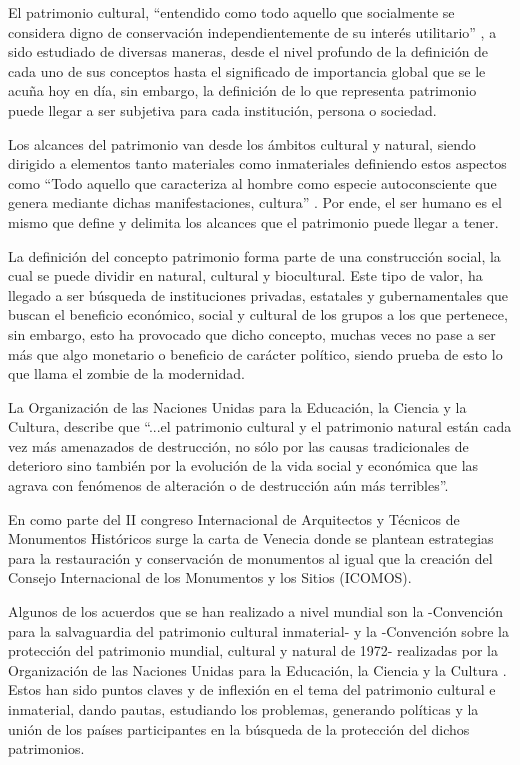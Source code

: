 El patrimonio cultural, ``entendido como todo aquello que socialmente se considera digno de conservación independientemente de su interés utilitario'' \citep[p. 63]{prats1998concepto}, a sido estudiado de diversas maneras, desde el nivel profundo de la definición de cada uno de sus conceptos hasta el significado de importancia global que se le acuña hoy en día, sin embargo, la definición de lo que representa patrimonio puede llegar a ser subjetiva para cada institución, persona o sociedad.

Los alcances del patrimonio van desde los ámbitos cultural y natural, siendo dirigido a elementos tanto materiales como inmateriales definiendo estos aspectos como ``Todo aquello que caracteriza al hombre como especie autoconsciente que genera mediante dichas manifestaciones, cultura'' \citep{dominguez2004pautas}. Por ende, el ser humano es el mismo que define y delimita los alcances que el patrimonio puede llegar a tener.

La definición del concepto patrimonio forma parte de una construcción social, la cual se puede dividir en natural, cultural y biocultural. Este tipo de valor, ha llegado a ser búsqueda de instituciones privadas, estatales y gubernamentales que buscan el beneficio económico, social y cultural de los grupos a los que pertenece, sin embargo, esto ha provocado que dicho concepto, muchas veces no pase a ser más que algo monetario o beneficio de carácter político, siendo prueba de esto lo que \cite{i2008zombi} llama el zombie de la modernidad.

La Organización de las Naciones Unidas para la Educación, la Ciencia y la Cultura, describe que ``...el patrimonio cultural y el patrimonio natural están cada vez más amenazados de destrucción, no sólo por las causas tradicionales de deterioro sino también por la evolución de la vida social y económica que las agrava con fenómenos de alteración o de destrucción aún más terribles''\citep[p. 1]{UNESCO1972}.

En \citeyear{venecia1964card} como parte del II congreso Internacional de Arquitectos y Técnicos de Monumentos Históricos surge la carta de Venecia donde se plantean estrategias para la restauración y conservación de monumentos al igual que la creación del Consejo Internacional de los Monumentos y los Sitios (ICOMOS).

Algunos de los acuerdos que se han realizado a nivel mundial son la -Convención para la salvaguardia del patrimonio cultural inmaterial- y la -Convención sobre la protección del patrimonio mundial, cultural y natural de 1972- realizadas por la Organización de las Naciones Unidas para la Educación, la Ciencia y la Cultura \citep{UNESCO2003, UNESCO1972}. Estos han sido puntos claves y de inflexión en el tema del patrimonio cultural e inmaterial, dando pautas, estudiando los problemas, generando políticas y la unión de los países participantes en la búsqueda de la protección del dichos patrimonios.

